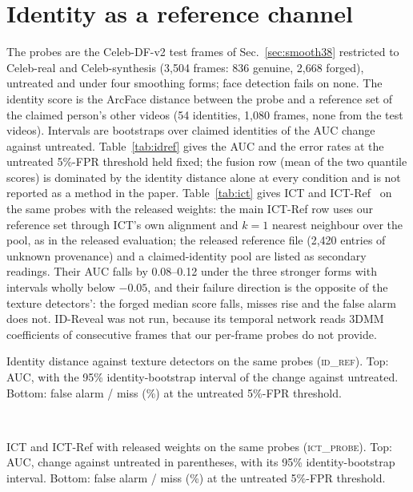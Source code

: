 \documentclass[10pt]{article}
\begin{document}
\section{Identity as a reference channel}
\label{sec:idref}
The probes are the Celeb-DF-v2 test frames of Sec.~\ref{sec:smooth38} restricted to Celeb-real and Celeb-synthesis (3,504
frames: 836 genuine, 2,668 forged), untreated and under four smoothing forms; face detection fails on none. The identity score
is the ArcFace distance between the probe and a reference set of the claimed person's other videos (54 identities, 1,080
frames, none from the test videos). Intervals are bootstraps over claimed identities of the AUC change against untreated.
Table~\ref{tab:idref} gives the AUC and the error rates at the untreated 5\%-FPR threshold held fixed; the fusion row (mean
of the two quantile scores) is dominated by the identity distance alone at every condition and is not reported as a method in
the paper. Table~\ref{tab:ict} gives ICT and ICT-Ref~\cite{ict2022} on the same probes with the released weights: the main
ICT-Ref row uses our reference set through ICT's own alignment and $k=1$ nearest neighbour over the pool, as in the released
evaluation; the released reference file (2,420 entries of unknown provenance) and a claimed-identity pool are listed as
secondary readings. Their AUC falls by 0.08--0.12 under the three stronger forms with intervals wholly below $-0.05$, and
their failure direction is the opposite of the texture detectors': the forged median score falls, misses rise and the false
alarm does not. ID-Reveal was not run, because its temporal network reads 3DMM coefficients of consecutive frames that our
per-frame probes do not provide.
\begin{table}[H]
\centering
\caption{Identity distance against texture detectors on the same probes (\textsc{id\_ref}). Top: AUC, with the 95\%
identity-bootstrap interval of the change against untreated. Bottom: false alarm / miss (\%) at the untreated 5\%-FPR threshold.}
\label{tab:idref}
\scriptsize
\begin{adjustbox}{max width=\linewidth}\end{adjustbox}\\[4pt]
\begin{adjustbox}{max width=\linewidth}\end{adjustbox}
\end{table}
\begin{table}[H]
\centering
\caption{ICT and ICT-Ref with released weights on the same probes (\textsc{ict\_probe}). Top: AUC, change against
untreated in parentheses, with its 95\% identity-bootstrap interval. Bottom: false alarm / miss (\%) at the untreated 5\%-FPR
threshold.}
\label{tab:ict}
\scriptsize
\begin{adjustbox}{max width=\linewidth}\end{adjustbox}\\[4pt]
\begin{adjustbox}{max width=\linewidth}\end{adjustbox}
\end{table}
\end{document}
